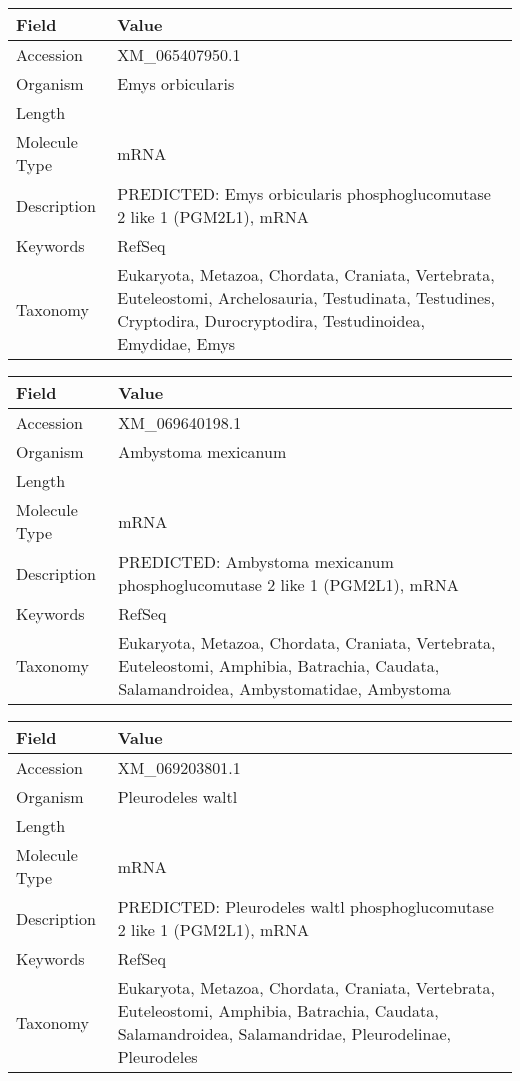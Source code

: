 \documentclass[10pt]{article}
\begin{document}
{\footnotesize
\begin{longtable}{>{\raggedright\arraybackslash}p{4.5cm} >{\raggedright\arraybackslash}p{11.5cm}}
\textbf{Field} & \textbf{Value} \\
\hline
Accession & XM\_065407950.1 \\
Organism & Emys orbicularis \\
Length & 1857 \\
Molecule Type & mRNA \\
Description & PREDICTED: Emys orbicularis phosphoglucomutase 2 like 1 (PGM2L1), mRNA \\
Keywords & RefSeq \\
Taxonomy & Eukaryota, Metazoa, Chordata, Craniata, Vertebrata, Euteleostomi, Archelosauria, Testudinata, Testudines, Cryptodira, Durocryptodira, Testudinoidea, Emydidae, Emys \\
\end{longtable}
}

{\footnotesize
\begin{longtable}{>{\raggedright\arraybackslash}p{4.5cm} >{\raggedright\arraybackslash}p{11.5cm}}
\textbf{Field} & \textbf{Value} \\
\hline
Accession & XM\_069640198.1 \\
Organism & Ambystoma mexicanum \\
Length & 3631 \\
Molecule Type & mRNA \\
Description & PREDICTED: Ambystoma mexicanum phosphoglucomutase 2 like 1 (PGM2L1), mRNA \\
Keywords & RefSeq \\
Taxonomy & Eukaryota, Metazoa, Chordata, Craniata, Vertebrata, Euteleostomi, Amphibia, Batrachia, Caudata, Salamandroidea, Ambystomatidae, Ambystoma \\
\end{longtable}
}

{\footnotesize
\begin{longtable}{>{\raggedright\arraybackslash}p{4.5cm} >{\raggedright\arraybackslash}p{11.5cm}}
\textbf{Field} & \textbf{Value} \\
\hline
Accession & XM\_069203801.1 \\
Organism & Pleurodeles waltl \\
Length & 4691 \\
Molecule Type & mRNA \\
Description & PREDICTED: Pleurodeles waltl phosphoglucomutase 2 like 1 (PGM2L1), mRNA \\
Keywords & RefSeq \\
Taxonomy & Eukaryota, Metazoa, Chordata, Craniata, Vertebrata, Euteleostomi, Amphibia, Batrachia, Caudata, Salamandroidea, Salamandridae, Pleurodelinae, Pleurodeles \\
\end{longtable}
}
\end{document}
